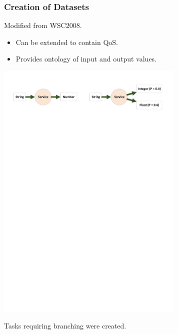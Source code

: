 \documentclass[xcolor={table}]{beamer}
\begin{document}
\begin{frame}
\frametitle{Creation of Datasets}
Modified from WSC2008.

\begin{itemize}
 \item Can be extended to contain QoS.
 \item Provides ontology of input and output values.
\end{itemize}

\centerline{\includegraphics[width=9cm]{dataset_example.pdf}}

\vfill

Tasks requiring branching were created.

\end{frame}

\end{document}
